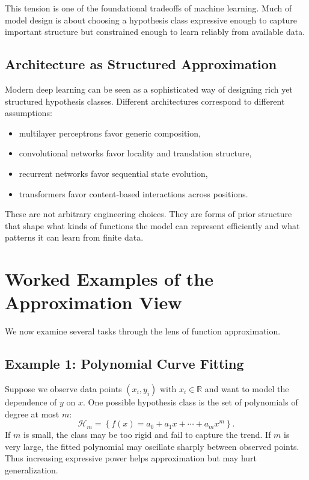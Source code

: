 This tension is one of the foundational tradeoffs of machine learning. Much of model design is about choosing a hypothesis class expressive enough to capture important structure but constrained enough to learn reliably from available data.

\subsection{Architecture as Structured Approximation}

Modern deep learning can be seen as a sophisticated way of designing rich yet structured hypothesis classes. Different architectures correspond to different assumptions:
\begin{itemize}
    \item multilayer perceptrons favor generic composition,
    \item convolutional networks favor locality and translation structure,
    \item recurrent networks favor sequential state evolution,
    \item transformers favor content-based interactions across positions.
\end{itemize}

These are not arbitrary engineering choices. They are forms of prior structure that shape what kinds of functions the model can represent efficiently and what patterns it can learn from finite data.

\section{Worked Examples of the Approximation View}

We now examine several tasks through the lens of function approximation.

\subsection{Example 1: Polynomial Curve Fitting}

Suppose we observe data points $(x_i,y_i)$ with $x_i \in \mathbb{R}$ and want to model the dependence of $y$ on $x$. One possible hypothesis class is the set of polynomials of degree at most $m$:
\[
\mathcal{H}_m = \left\{ f(x)=a_0+a_1x+\cdots+a_mx^m \right\}.
\]
If $m$ is small, the class may be too rigid and fail to capture the trend. If $m$ is very large, the fitted polynomial may oscillate sharply between observed points. Thus increasing expressive power helps approximation but may hurt generalization.

